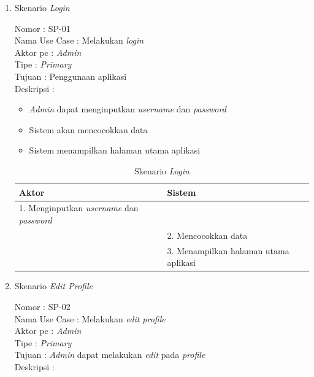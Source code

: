\begin{enumerate}
	\item Skenario \textit{Login}
	
	Nomor \kern 3.6pc : SP-01 \\
	Nama Use Case : Melakukan \textit{login} \\
	Aktor  pc : \textit{Admin} \\
	Tipe \kern 4.6pc : \textit{Primary} \\
	Tujuan \kern 3.6pc : Penggunaan aplikasi \\
	Deskripsi \kern 2.5pc : 
	
	\begin{itemize}
		\item \textit{Admin} dapat menginputkan \textit{username} dan \textit{password}
		\item Sistem akan mencocokkan data
		\item Sistem menampilkan halaman utama aplikasi
	\end{itemize}

	\begin{table}
		\caption{Skenario \textit{Login}}
		\centering
		\begin{tabular}{ | p{55mm} | p{60mm} |}
			\hline 
			\textbf{Aktor} & \textbf{Sistem} \\
			\hline
			
			1.	Menginputkan \textit{username} dan \textit{password} &  \\
			
			\hline
			
			& 2. Mencocokkan data \\
			
			\hline
			
			& 3.	Menampilkan halaman utama aplikasi \\
		
			\hline
			
		\end{tabular}
	\end{table}

\item Skenario\textit{ Edit Profile}

Nomor \kern 3.6pc : SP-02 \\
Nama Use Case : Melakukan \textit{edit profile} \\
Aktor  pc : \textit{Admin} \\
Tipe \kern 4.6pc : \textit{Primary} \\
Tujuan \kern 3.6pc : \textit{Admin} dapat melakukan \textit{edit} pada \textit{profile} \\
Deskripsi \kern 2.5pc : 


\end{enumerate}
